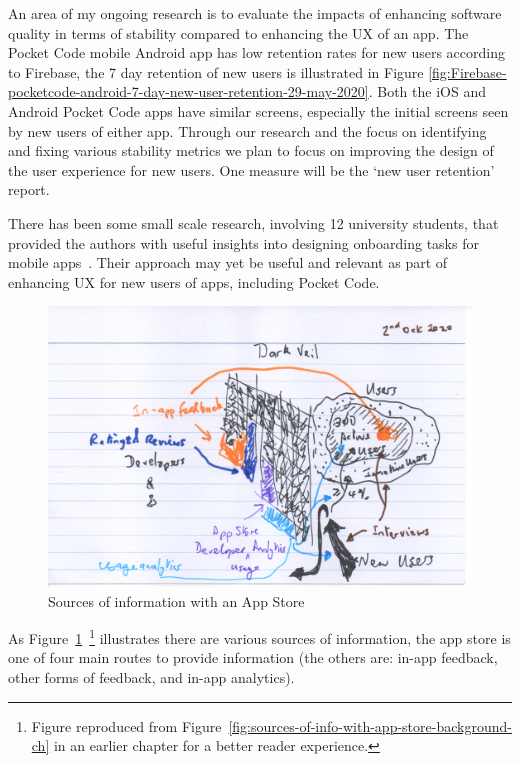 An area of my ongoing research is to evaluate the impacts of enhancing software quality in terms of stability compared to enhancing the UX of an app. The Pocket Code mobile Android app has low retention rates for new users according to Firebase, the 7 day retention of new users is illustrated in Figure \ref{fig:Firebase-pocketcode-android-7-day-new-user-retention-29-may-2020}. Both the iOS and Android Pocket Code apps have similar screens, especially the initial screens seen by new users of either app. Through our research and the focus on identifying and fixing various stability metrics we plan to focus on improving the design of the user experience for new users. One measure will be the `new user retention' report.

There has been some small scale research, involving 12 university students, that provided the authors with useful insights into designing onboarding tasks for mobile apps~\citep{strahm2018_mobile_app_onboarding}. Their approach may yet be useful and relevant as part of enhancing UX for new users of apps, including Pocket Code.

\begin{figure}[htbp!]
    \centering
    \includegraphics[width=13cm]{images/rough-sketches/sources-of-information-with-app-store-1.png}
    \caption{Sources of information with an App Store}
    \label{fig:sources-of-info-with-app-store-future-work-ch}
\end{figure}

As Figure~\ref{fig:sources-of-info-with-app-store-future-work-ch}~\footnote{Figure reproduced from Figure~\ref{fig:sources-of-info-with-app-store-background-ch} in an earlier chapter for a better reader experience.} illustrates there are various sources of information, the app store is one of four main routes to provide information (the others are: in-app feedback, other forms of feedback, and in-app analytics).


